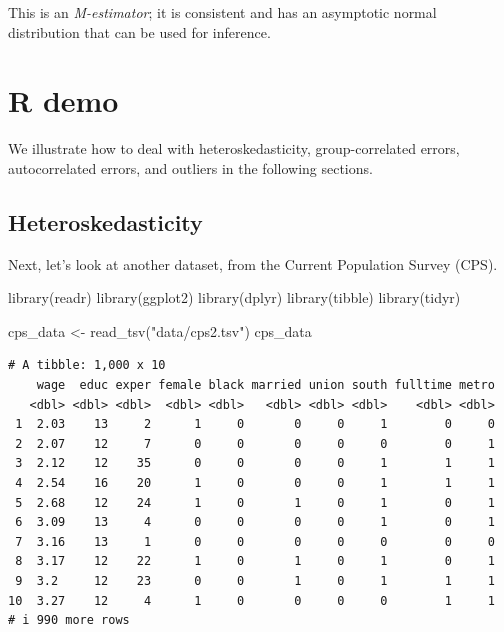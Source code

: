 \documentclass[
  11pt,
  letterpaper,
  oneside]{book}
\newenvironment{Shaded}{\begin{snugshade}}{\end{snugshade}}
\newcommand{\FunctionTok}[1]{\textcolor[rgb]{0.28,0.35,0.67}{#1}}
\newcommand{\NormalTok}[1]{\textcolor[rgb]{0.00,0.23,0.31}{#1}}
\newcommand{\OtherTok}[1]{\textcolor[rgb]{0.00,0.23,0.31}{#1}}
\newcommand{\StringTok}[1]{\textcolor[rgb]{0.13,0.47,0.30}{#1}}
\theoremstyle{definition}
\theoremstyle{plain}
\theoremstyle{plain}
\theoremstyle{plain}
\theoremstyle{remark}
\begin{document}
This is an \emph{M-estimator}; it is consistent and has an asymptotic
normal distribution that can be used for inference.

\hypertarget{sec-R-demo-misspecification}{%
\chapter{R demo}\label{sec-R-demo-misspecification}}

We illustrate how to deal with heteroskedasticity, group-correlated
errors, autocorrelated errors, and outliers in the following sections.

\hypertarget{heteroskedasticity}{%
\section{Heteroskedasticity}\label{heteroskedasticity}}

Next, let's look at another dataset, from the Current Population Survey
(CPS).

\begin{Shaded}
\begin{Highlighting}[]
\FunctionTok{library}\NormalTok{(readr)}
\FunctionTok{library}\NormalTok{(ggplot2)}
\FunctionTok{library}\NormalTok{(dplyr)}
\FunctionTok{library}\NormalTok{(tibble)}
\FunctionTok{library}\NormalTok{(tidyr)}

\NormalTok{cps\_data }\OtherTok{\textless{}{-}} \FunctionTok{read\_tsv}\NormalTok{(}\StringTok{"data/cps2.tsv"}\NormalTok{)}
\NormalTok{cps\_data}
\end{Highlighting}
\end{Shaded}

\begin{verbatim}
# A tibble: 1,000 x 10
    wage  educ exper female black married union south fulltime metro
   <dbl> <dbl> <dbl>  <dbl> <dbl>   <dbl> <dbl> <dbl>    <dbl> <dbl>
 1  2.03    13     2      1     0       0     0     1        0     0
 2  2.07    12     7      0     0       0     0     0        0     1
 3  2.12    12    35      0     0       0     0     1        1     1
 4  2.54    16    20      1     0       0     0     1        1     1
 5  2.68    12    24      1     0       1     0     1        0     1
 6  3.09    13     4      0     0       0     0     1        0     1
 7  3.16    13     1      0     0       0     0     0        0     0
 8  3.17    12    22      1     0       1     0     1        0     1
 9  3.2     12    23      0     0       1     0     1        1     1
10  3.27    12     4      1     0       0     0     0        1     1
# i 990 more rows
\end{verbatim}
\end{document}
